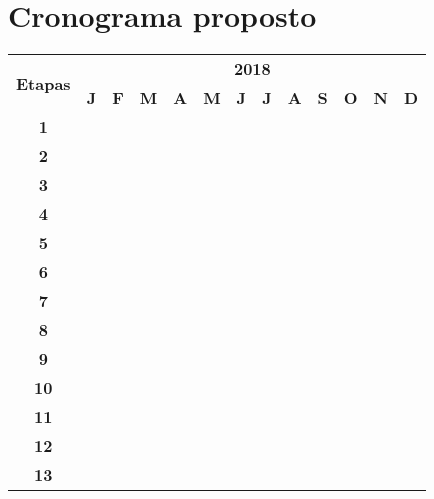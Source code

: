 \section{Cronograma proposto}
\label{cro}

\vspace{0.5cm}
{\tiny
\noindent \begin{tabular}{|c||c|c|c|c|c|c|c|c|c|c|c|c|}
  \hline
  \multirow{2}{*}{\textbf{\small{Etapas}}} & \multicolumn{12}{|c||}{\textbf{\small{2018}}} \\
  \cline{2-13}
   & \textbf{J} & \textbf{F} & \textbf{M} & \textbf{A} & \textbf{M} & \textbf{J} & \textbf{J} & \textbf{A} & \textbf{S} & \textbf{O} & \textbf{N} & \textbf{D} \\
  \hline \hline
  \textbf{\small{1}} & & & \cellcolor{black} & & & & & & & & & \\ \hline
  \textbf{\small{2}} & & & \cellcolor{black} & \cellcolor{black} & & & & & & & & \\ \hline
  \textbf{\small{3}} & & & & \cellcolor{black} & & & & & & & & \\ \hline
  \textbf{\small{4}} & & & & \cellcolor{black} & \cellcolor{black} & & & & & & & \\ \hline
  \textbf{\small{5}} & & & & & \cellcolor{black} & & & & & & & \\ \hline
  \textbf{\small{6}} & & & & & & \cellcolor{black} & & & & & & \\ \hline
  \textbf{\small{7}} & & & \cellcolor{black} & \cellcolor{black} & \cellcolor{black} & \cellcolor{black} & & & & & & \\ \hline
  \textbf{\small{8}} & & & & & & & \cellcolor{black} & & & & & \\ \hline
  \textbf{\small{9}} & & & & & & & \cellcolor{black} & & & & & \\ \hline
  \textbf{\small{10}} & & & & & & & & \cellcolor{black} & & & & \\ \hline
  \textbf{\small{11}} & & & & & & & & & \cellcolor{black} & & & \\ \hline
  \textbf{\small{12}} & & & & & & & & & \cellcolor{black} & \cellcolor{black} & & \\ \hline
  \textbf{\small{13}} & & & & & & & \cellcolor{black} & \cellcolor{black} & \cellcolor{black} & \cellcolor{black} & \cellcolor{black} & \\ \hline
\end{tabular}
}
